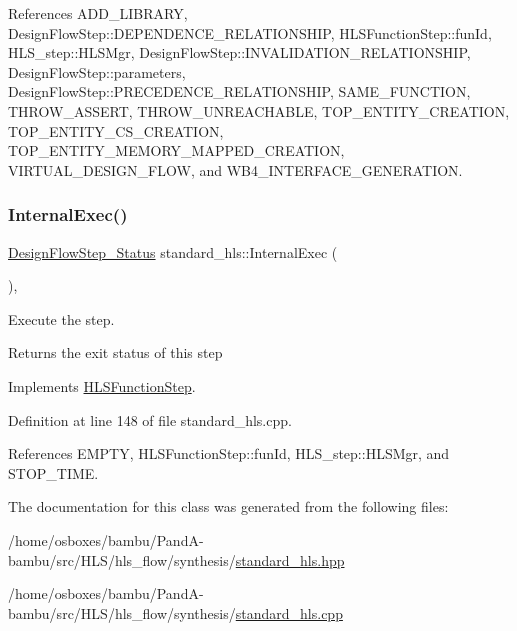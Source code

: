 References A\+D\+D\+\_\+\+L\+I\+B\+R\+A\+RY, Design\+Flow\+Step\+::\+D\+E\+P\+E\+N\+D\+E\+N\+C\+E\+\_\+\+R\+E\+L\+A\+T\+I\+O\+N\+S\+H\+IP, H\+L\+S\+Function\+Step\+::fun\+Id, H\+L\+S\+\_\+step\+::\+H\+L\+S\+Mgr, Design\+Flow\+Step\+::\+I\+N\+V\+A\+L\+I\+D\+A\+T\+I\+O\+N\+\_\+\+R\+E\+L\+A\+T\+I\+O\+N\+S\+H\+IP, Design\+Flow\+Step\+::parameters, Design\+Flow\+Step\+::\+P\+R\+E\+C\+E\+D\+E\+N\+C\+E\+\_\+\+R\+E\+L\+A\+T\+I\+O\+N\+S\+H\+IP, S\+A\+M\+E\+\_\+\+F\+U\+N\+C\+T\+I\+ON, T\+H\+R\+O\+W\+\_\+\+A\+S\+S\+E\+RT, T\+H\+R\+O\+W\+\_\+\+U\+N\+R\+E\+A\+C\+H\+A\+B\+LE, T\+O\+P\+\_\+\+E\+N\+T\+I\+T\+Y\+\_\+\+C\+R\+E\+A\+T\+I\+ON, T\+O\+P\+\_\+\+E\+N\+T\+I\+T\+Y\+\_\+\+C\+S\+\_\+\+C\+R\+E\+A\+T\+I\+ON, T\+O\+P\+\_\+\+E\+N\+T\+I\+T\+Y\+\_\+\+M\+E\+M\+O\+R\+Y\+\_\+\+M\+A\+P\+P\+E\+D\+\_\+\+C\+R\+E\+A\+T\+I\+ON, V\+I\+R\+T\+U\+A\+L\+\_\+\+D\+E\+S\+I\+G\+N\+\_\+\+F\+L\+OW, and W\+B4\+\_\+\+I\+N\+T\+E\+R\+F\+A\+C\+E\+\_\+\+G\+E\+N\+E\+R\+A\+T\+I\+ON.

\mbox{\label{classstandard__hls_a4ee80875c48a659dbee7f3081c2f882d}} 
\subsubsection{\texorpdfstring{Internal\+Exec()}{InternalExec()}}
{\footnotesize\ttfamily \hyperlink{design__flow__step_8hpp_afb1f0d73069c26076b8d31dbc8ebecdf}{Design\+Flow\+Step\+\_\+\+Status} standard\+\_\+hls\+::\+Internal\+Exec (\begin{DoxyParamCaption}{ }\end{DoxyParamCaption})\hspace{0.3cm}{\ttfamily [override]}, {\ttfamily [virtual]}}



Execute the step. 

\begin{DoxyReturn}{Returns}
the exit status of this step 
\end{DoxyReturn}


Implements \hyperlink{classHLSFunctionStep_a8db4c00d080655984d98143206fc9fa8}{H\+L\+S\+Function\+Step}.



Definition at line 148 of file standard\+\_\+hls.\+cpp.



References E\+M\+P\+TY, H\+L\+S\+Function\+Step\+::fun\+Id, H\+L\+S\+\_\+step\+::\+H\+L\+S\+Mgr, and S\+T\+O\+P\+\_\+\+T\+I\+ME.



The documentation for this class was generated from the following files\+:\begin{DoxyCompactItemize}
\item 
/home/osboxes/bambu/\+Pand\+A-\/bambu/src/\+H\+L\+S/hls\+\_\+flow/synthesis/\hyperlink{standard__hls_8hpp}{standard\+\_\+hls.\+hpp}\item 
/home/osboxes/bambu/\+Pand\+A-\/bambu/src/\+H\+L\+S/hls\+\_\+flow/synthesis/\hyperlink{standard__hls_8cpp}{standard\+\_\+hls.\+cpp}\end{DoxyCompactItemize}
